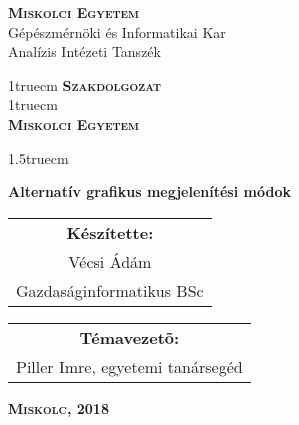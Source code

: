 

\pagestyle{empty} %

\begin{flushleft}
\textsc{\bfseries Miskolci Egyetem}\\
Gépészmérnöki és Informatikai Kar\\
Analízis Intézeti Tanszék
\end{flushleft}

{\large
\begin{center}
\vglue 1truecm
\textbf{\huge\textsc{Szakdolgozat}}\\
\vglue 1truecm
\\
\textbf{\textsc{Miskolci Egyetem}}
\end{center}}

\vglue 1.5truecm %

{\LARGE
\begin{center}
\textbf{Alternatív grafikus megjelenítési módok}
\end{center}}

\vspace*{2.5truecm}
{\large
\begin{center}
\begin{tabular}{c}
\textbf{Készítette:}\\
Vécsi Ádám\\
Gazdaságinformatikus BSc
\end{tabular}
\end{center}
\begin{center}
\begin{tabular}{c}
\textbf{Témavezetõ:}\\
Piller Imre, egyetemi tanársegéd
\end{tabular}
\end{center}}
\vfill
{\large
\begin{center}
\textbf{\textsc{Miskolc, 2018}}
\end{center}}

\newpage